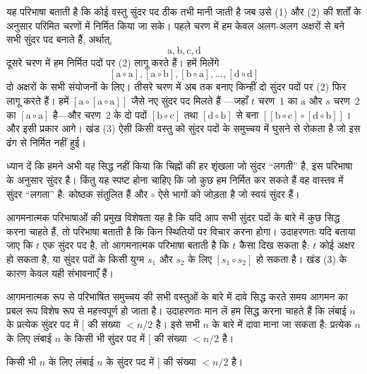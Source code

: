 \documentclass[../../../include/open-logic-section]{subfiles}
\begin{document}
यह परिभाषा बताती है कि कोई वस्तु सुंदर पद ठीक तभी मानी जाती है जब उसे (1)
और (2) की शर्तों के अनुसार परिमित चरणों में निर्मित किया जा सके। पहले चरण
में हम केवल अलग-अलग अक्षरों से बने सभी सुंदर पद बनाते हैं, अर्थात्,
\[
\mathrm{a}, \mathrm{b}, \mathrm{c}, \mathrm{d}
\]
दूसरे चरण में हम निर्मित पदों पर (2) लागू करते हैं। हमें मिलेंगे
\[
[\mathrm{a} \circ \mathrm{a}], [\mathrm{a} \circ \mathrm{b}],
[\mathrm{b} \circ \mathrm{a}], \dots, [\mathrm{d} \circ \mathrm{d}]
\]
दो अक्षरों के सभी संयोजनों के लिए। तीसरे चरण में अब तक बनाए किन्हीं दो सुंदर
पदों पर (2) फिर लागू करते हैं। हमें
$[\mathrm{a}\circ[\mathrm{a}\circ\mathrm{a}]]$ जैसे नए सुंदर पद मिलते हैं
---जहाँ $t$ चरण~1 का $\mathrm{a}$ और $s$ चरण~2 का
$[\mathrm{a}\circ\mathrm{a}]$ है---और चरण~2 के दो पदों
$[\mathrm{b}\circ\mathrm{c}]$ तथा $[\mathrm{d}\circ\mathrm{b}]$ से बना
$[[\mathrm{b}\circ\mathrm{c}]\circ[\mathrm{d}\circ\mathrm{b}]]$। और इसी
प्रकार आगे। खंड (3) ऐसी किसी वस्तु को सुंदर पदों के समुच्चय में घुसने से
रोकता है जो इस ढंग से निर्मित नहीं हुई।

ध्यान दें कि हमने अभी यह सिद्ध नहीं किया कि चिह्नों की हर शृंखला जो सुंदर
``लगती'' है, इस परिभाषा के अनुसार सुंदर है। किंतु यह स्पष्ट होना चाहिए कि
जो कुछ हम निर्मित कर सकते हैं वह वास्तव में सुंदर ``लगता'' है: कोष्ठक
संतुलित हैं और $\circ$ ऐसे भागों को जोड़ता है जो स्वयं सुंदर हैं।

आगमनात्मक परिभाषाओं की प्रमुख विशेषता यह है कि यदि आप सभी सुंदर पदों के
बारे में कुछ सिद्ध करना चाहते हैं, तो परिभाषा बताती है कि किन स्थितियों पर
विचार करना होगा। उदाहरणतः यदि बताया जाए कि $t$ एक सुंदर पद है, तो आगमनात्मक
परिभाषा बताती है कि $t$ कैसा दिख सकता है: $t$ कोई अक्षर हो सकता है, या सुंदर
पदों के किसी युग्म $s_1$ और $s_2$ के लिए $[s_1\circ s_2]$ हो सकता है। खंड
(3) के कारण केवल यही संभावनाएँ हैं।

आगमनात्मक रूप से परिभाषित समुच्चय की सभी वस्तुओं के बारे में दावे सिद्ध
करते समय आगमन का प्रबल रूप विशेष रूप से महत्त्वपूर्ण हो जाता है। उदाहरणतः
मान लें हम सिद्ध करना चाहते हैं कि लंबाई $n$ के प्रत्येक सुंदर पद में $[$
की संख्या $<n/2$ है। इसे सभी $n$ के बारे में दावा माना जा सकता है: प्रत्येक
$n$ के लिए लंबाई $n$ के किसी भी सुंदर पद में $[$ की संख्या $<n/2$ है।

\begin{prop}
  किसी भी $n$ के लिए लंबाई $n$ के सुंदर पद में $[$ की संख्या $<n/2$ है।
\end{prop}
\end{document}
